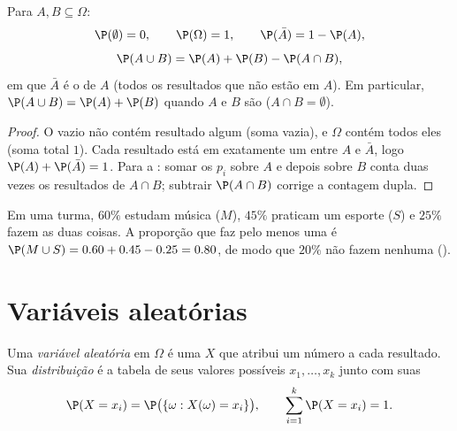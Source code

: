 \begin{proposition}\label{prop:g11:prob:rules}
Para  $A, B \subseteq \Omega$:
\[
\P(\emptyset) = 0, \qquad \P(\Omega) = 1, \qquad
\P(\bar A) = 1 - \P(A),
\]
\[
\P(A \cup B) = \P(A) + \P(B) - \P(A \cap B),
\]
em que $\bar A$ é o \emph{} de $A$ (todos os resultados que
não estão em $A$). Em particular, $\P(A \cup B) = \P(A) + \P(B)$ quando
$A$ e $B$ são \emph{} ($A \cap B = \emptyset$).
\end{proposition}

\begin{proof}
O  vazio não contém resultado algum (soma vazia), e $\Omega$
contém todos eles (soma total $1$). Cada resultado está em exatamente um
entre $A$ e $\bar A$, logo $\P(A) + \P(\bar A) = 1$. Para a : somar
os $p_i$ sobre $A$ e depois sobre $B$ conta duas vezes os resultados de
$A \cap B$; subtrair $\P(A \cap B)$ corrige a contagem dupla.
\end{proof}

\begin{example}
Em uma turma, $60\%$ estudam música ($M$), $45\%$ praticam um esporte
($S$) e $25\%$ fazem as duas coisas. A proporção que faz pelo menos uma é
$\P(M \cup S) = 0.60 + 0.45 - 0.25 = 0.80$, de modo que $20\%$ não fazem
nenhuma ().
\end{example}

\section{Variáveis aleatórias}

\begin{definition}\label{def:g11:prob:rv}
Uma \emph{variável aleatória} em $\Omega$ é uma
 $X$ que atribui um número a cada resultado. Sua
\emph{distribuição} é a tabela de seus valores
possíveis $x_1, \dots, x_k$ junto com suas 
\[
\P(X = x_i) = \P\bigl(\{\omega : X(\omega) = x_i\}\bigr),
\qquad
\sum_{i=1}^k \P(X = x_i) = 1 .
\]
\end{definition}

